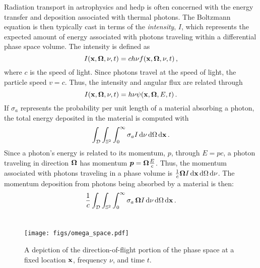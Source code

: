 \documentclass[../doc.tex]{subfiles}
\begin{document}
Radiation transport in astrophysics and \gls{hedp} is often concerned with the energy transfer and deposition associated with thermal photons. The Boltzmann equation is then typically cast in terms of the \emph{intensity}, $I$, which represents the expected amount of energy associated with photons traveling within a differential phase space volume. The intensity is defined as 
	\begin{equation}
		I(\boldsymbol{\mathrm{x}},\boldsymbol{\Omega},\nu,t) = c h \nu f(\boldsymbol{\mathrm{x}},\boldsymbol{\Omega},\nu,t) \,,
	\end{equation}
where $c$ is the speed of light. Since photons travel at the speed of light, the particle speed $v = c$. Thus, the intensity and angular flux are related through 
	\begin{equation}
		I(\boldsymbol{\mathrm{x}},\boldsymbol{\Omega},\nu,t) = h\nu \psi(\boldsymbol{\mathrm{x}},\boldsymbol{\Omega},E,t) \,. 
	\end{equation}
If $\sigma_a$ represents the probability per unit length of a material absorbing a photon, the total energy deposited in the material is computed with 
	\begin{equation}
		\int_{\mathcal{D}} \int_{\mathbb{S}^2} \int_0^\infty \sigma_a I \mathop{}\!\mathrm{d} \nu \mathop{}\!\mathrm{d}\Omega \mathop{}\!\mathrm{d} \boldsymbol{\mathrm{x}} \,. 
	\end{equation}
Since a photon's energy is related to its momentum, $p$, through $E = p c$, a photon traveling in direction $\boldsymbol{\Omega}$ has momentum $\boldsymbol{p} = \boldsymbol{\Omega} \frac{E}{c}$. Thus, the momentum associated with photons traveling in a phase volume is $\frac{1}{c}\boldsymbol{\Omega} I \mathop{}\!\mathrm{d} \boldsymbol{\mathrm{x}} \mathop{}\!\mathrm{d}\Omega \mathop{}\!\mathrm{d} \nu$. 
The momentum deposition from photons being absorbed by a material is then: 
	\begin{equation}
		\frac{1}{c}\int_{\mathcal{D}} \int_{\mathbb{S}^2} \int_0^\infty \sigma_a\,\boldsymbol{\Omega} I \mathop{}\!\mathrm{d} \nu \mathop{}\!\mathrm{d} \Omega\mathop{}\!\mathrm{d} \boldsymbol{\mathrm{x}} \,. 
	\end{equation}

\section{}
\section{}
\section{}
\section{}

\begin{figure}
\centering
\texttt{[image: figs/omega\_space.pdf]}
\caption{A depiction of the direction-of-flight portion of the phase space at a fixed location $\boldsymbol{\mathrm{x}}$, frequency $\nu$, and time $t$. }
\label{trans:omega_space_diag}
\end{figure}
\end{document}
